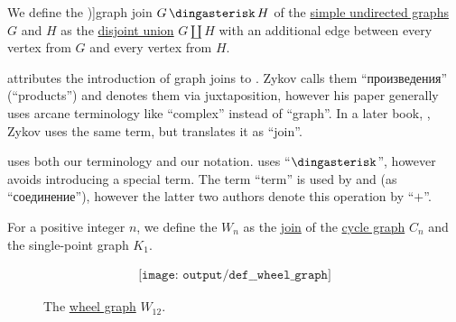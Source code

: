 \begin{definition}\label{def:graph_join}
  We define the \term[ru=соединение (графов) (\cite[265]{Новиков2013ДискретнаяМатематика})]{graph join} \( G \Ast H \) of the \hyperref[def:undirected_graph]{simple undirected graphs} \( G \) and \( H \) as the \hyperref[def:graph_disjoint_union]{disjoint union} \( G \coprod H \) with an additional edge between every vertex from \( G \) and every vertex from \( H \).
\end{definition}
\begin{comments}
  \item {} attributes the introduction of graph joins to \cite[164]{Зыков1949СоединенияГрафов}. Zykov calls them \enquote{произведения} (\enquote{products}) and denotes them via juxtaposition, however his paper generally uses arcane terminology like \enquote{complex} instead of \enquote{graph}. In a later book, \cite[23]{Зыков2004ТеорияГрафов}, Zykov uses the same term, but translates it as \enquote{join}.

   uses both our terminology and our notation.  uses \enquote{\( \Ast \)}, however avoids introducing a special term. The term \enquote{term} is used by  and  (as \enquote{соединение}), however the latter two authors denote this operation by \enquote{\( + \)}.
\end{comments}

\begin{definition}\label{def:wheel_graph}
  For a positive integer \( n \), we define the  \( W_n \) as the \hyperref[def:graph_join]{join} of the \hyperref[def:cycle_graph]{cycle graph} \( C_n \) and the single-point graph \( K_1 \).

  \begin{figure}[!ht]
    \begin{equation}\label{eq:fig:def:wheel_graph/w12}
      \begin{aligned}
        \texttt{[image: output/def\_\_wheel\_graph]}
      \end{aligned}
    \end{equation}
    \caption{The \hyperref[def:wheel_graph]{wheel graph} \( W_{12} \).}\label{fig:def:wheel_graph/c12}
  \end{figure}
\end{definition}

